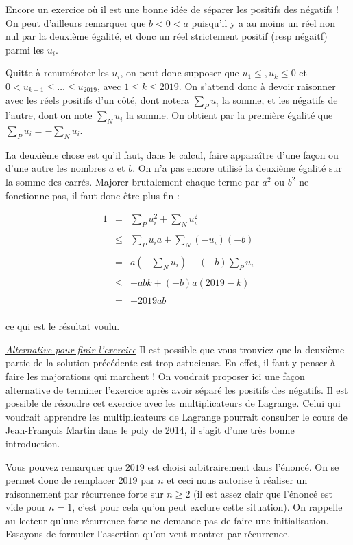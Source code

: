 \begin{sol}
Encore un exercice où il est une bonne idée de séparer les positifs des négatifs ! On peut d'ailleurs remarquer que $b < 0 < a$ puisqu'il y a au moins un réel non nul par la deuxième égalité, et donc un réel strictement positif (resp négaitf) parmi les $u_i$.

Quitte à renuméroter les $u_i$, on peut donc supposer que $u_1 \le , u_k \le 0$ et $0<u_{k+1} \le \ldots \le u_{2019}$, avec $1\le k \le 2019$. On s'attend donc à devoir raisonner avec les réels positifs d'un côté, dont notera $\sum_P u_i$ la somme, et les négatifs de l'autre, dont on note $\sum_N u_i$ la somme. On obtient par la première égalité que $\sum_P u_i = - \sum_N u_i$.

La deuxième chose est qu'il faut, dans le calcul, faire apparaître d'une façon ou d'une autre les nombres $a$ et $b$. On n'a pas encore utilisé la deuxième égalité sur la somme des carrés. Majorer brutalement chaque terme par $a^2$ ou $b^2$ ne fonctionne pas, il faut donc être plus fin :

$$\begin{array}{lll}
1 &=&\displaystyle \sum_P u_i^2 + \sum_N u_i^2 \\
&&\\
&\le & \displaystyle \sum_P u_i a + \sum_N (-u_i) (-b)\\
&&\\
&=&\displaystyle a(-\sum_N u_i) + (-b) \sum_P u_i \\
&&\\
&\le&\displaystyle -abk + (-b) a(2019-k) \\
&&\\
&=& \displaystyle -2019ab\\
\end{array}$$

ce qui est le résultat voulu.

\underline{\textit{Alternative pour finir l'exercice}}
Il est possible que vous trouviez que la deuxième partie de la solution précédente est trop astucieuse. En effet, il faut y penser à faire les majorations qui marchent ! On voudrait proposer ici une façon alternative de terminer l'exercice après avoir séparé les positifs des négatifs. Il est possible de résoudre cet exercice avec les multiplicateurs de Lagrange. Celui qui voudrait apprendre les multiplicateurs de Lagrange pourrait consulter le cours de Jean-François Martin dans le poly de 2014, il s'agit d'une très bonne introduction.

Vous pouvez remarquer que $2019$ est choisi arbitrairement dans l'énoncé. On se permet donc de remplacer $2019$ par $n$ et ceci nous autorise à réaliser un raisonnement par récurrence forte sur $n \ge 2$ (il est assez clair que l'énoncé est vide pour $n=1$, c'est pour cela qu'on peut exclure cette situation). On rappelle au lecteur qu'une récurrence forte ne demande pas de faire une initialisation. Essayons de formuler l'assertion qu'on veut montrer par récurrence.


\end{sol}
